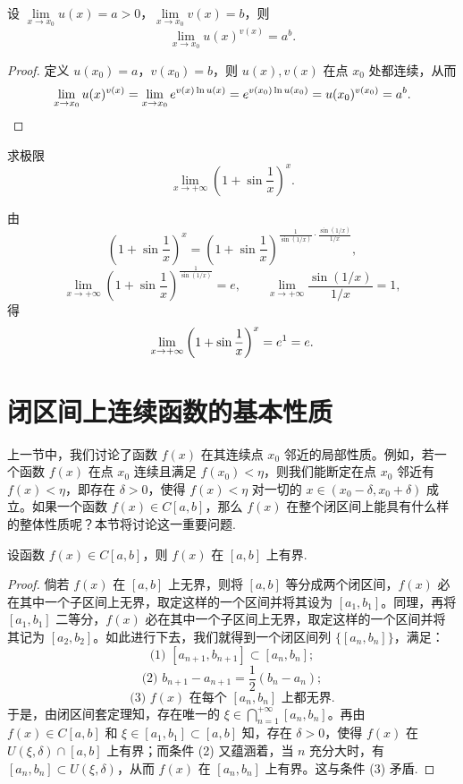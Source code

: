 \begin{example}\label{example:ma-3-2-10}
设 $\lim\limits_{x\to x_0}u(x)=a>0$，$\lim\limits_{x\to x_0}v(x)=b$，则
\[
  \lim_{x\to x_0}u(x)^{v(x)}=a^b.
\]
\end{example}


\begin{proof}
定义 $u(x_0)=a$，$v(x_0)=b$，则 $u(x),v(x)$ 在点 $x_0$ 处都连续，从而
\[
  \lim_{x\to x_0}u(x)^{v(x)}
  =
  \lim_{x\to x_0}e^{v(x)\ln u(x)}
  =
  e^{v(x_0)\ln u(x_0)}
  =
  u(x_0)^{v(x_0)}
  =
  a^b.
\qedhere
\]
\end{proof}


\begin{example}\label{example:ma-3-2-11}
求极限
\[
  \lim_{x\to+\infty}\left(1+\sin\frac1x\right)^x.
\]
\end{example}


\begin{solve}
由
\[
  \left(1+\sin\frac1x\right)^x
  =
  \left(1+\sin\frac1x\right)^{\frac1{\sin(1/x)}\cdot\frac{\sin(1/x)}{1/x}},
\]
\[
  \lim_{x\to+\infty}\left(1+\sin\frac1x\right)^{\frac1{\sin(1/x)}}=e,
  \qquad
  \lim_{x\to+\infty}\frac{\sin(1/x)}{1/x}=1,
\]
得
\[
  \lim_{x\to+\infty}\left(1+\sin\frac1x\right)^x=e^1=e.
\qedhere
\]
\end{solve}


\section{闭区间上连续函数的基本性质}
\label{sec:ma-3-3}

上一节中，我们讨论了函数 $f(x)$ 在其连续点 $x_0$ 邻近的局部性质。例如，若一个函数 $f(x)$ 在点 $x_0$ 连续且满足 $f(x_0)<\eta$，则我们能断定在点 $x_0$ 邻近有 $f(x)<\eta$，即存在 $\delta>0$，使得 $f(x)<\eta$ 对一切的 $x\in(x_0-\delta,x_0+\delta)$ 成立。如果一个函数 $f(x)\in C[a,b]$，那么 $f(x)$ 在整个闭区间上能具有什么样的整体性质呢？本节将讨论这一重要问题.

\begin{theorem}[{有界性}]\label{theorem:ma-3-3-1}
设函数 $f(x)\in C[a,b]$，则 $f(x)$ 在 $[a,b]$ 上有界.
\end{theorem}


\begin{proof}
倘若 $f(x)$ 在 $[a,b]$ 上无界，则将 $[a,b]$ 等分成两个闭区间，$f(x)$ 必在其中一个子区间上无界，取定这样的一个区间并将其设为 $[a_1,b_1]$。同理，再将 $[a_1,b_1]$ 二等分，$f(x)$ 必在其中一个子区间上无界，取定这样的一个区间并将其记为 $[a_2,b_2]$。如此进行下去，我们就得到一个闭区间列 $\{[a_n,b_n]\}$，满足：
\[
  \text{(1) } [a_{n+1},b_{n+1}]\subset [a_n,b_n];
\]
\[
  \text{(2) } b_{n+1}-a_{n+1}=\frac12(b_n-a_n);
\]
\[
  \text{(3) } f(x)\text{ 在每个 }[a_n,b_n]\text{ 上都无界.}
\]
于是，由闭区间套定理知，存在唯一的 $\xi\in\bigcap\limits_{n=1}^{+\infty}[a_n,b_n]$。再由 $f(x)\in C[a,b]$ 和 $\xi\in[a_1,b_1]\subset[a,b]$ 知，存在 $\delta>0$，使得 $f(x)$ 在 $U(\xi,\delta)\cap[a,b]$ 上有界；而条件 (2) 又蕴涵着，当 $n$ 充分大时，有 $[a_n,b_n]\subset U(\xi,\delta)$，从而 $f(x)$ 在 $[a_n,b_n]$ 上有界。这与条件 (3) 矛盾.
\end{proof}


